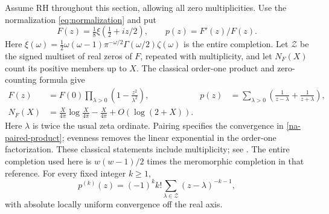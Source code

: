 Assume RH throughout this section, allowing all zero multiplicities.
Use the normalization \eqref{eq:normalization} and put
\[
 F(z)=\tfrac18\xi(\tfrac12+iz/2),\qquad p(z)=F'(z)/F(z).
\]
Here $\xi(\omega)=\tfrac12\omega(\omega-1)\pi^{-\omega/2}
\Gamma(\omega/2)\zeta(\omega)$ is the entire completion.
Let $\mathcal Z$ be the signed multiset of real zeros of $F$, repeated
with multiplicity, and let $N_F(X)$ count its positive members up to $X$.
The classical order-one product and zero-counting formula give
\begin{align}
 F(z)&=F(0)\prod_{\lambda>0}
              \left(1-\frac{z^2}{\lambda^2}\right),
 &p(z)&=\sum_{\lambda>0}
        \left(\frac1{z-\lambda}+\frac1{z+\lambda}\right),
 \label{na-paired-product}\\
 N_F(X)&=\frac X{4\pi}\log\frac X{4\pi}-\frac X{4\pi}
                      +O(\log(2+X)).
 \label{na-zero-count}
\end{align}
Here $\lambda$ is twice the usual zeta ordinate. Pairing specifies the
convergence in \eqref{na-paired-product}; evenness removes the linear
exponential in the order-one factorization. These classical statements
include multiplicity; see \cite{Elkies}. The entire completion used here
is $w(w-1)/2$ times the meromorphic completion in that reference.
For every fixed integer $k\ge1$,
\begin{equation}
 p^{(k)}(z)=(-1)^k k!\sum_{\lambda\in\mathcal Z}
                         (z-\lambda)^{-k-1},
 \label{na-log-derivative-product}
\end{equation}
with absolute locally uniform convergence off the real axis.

